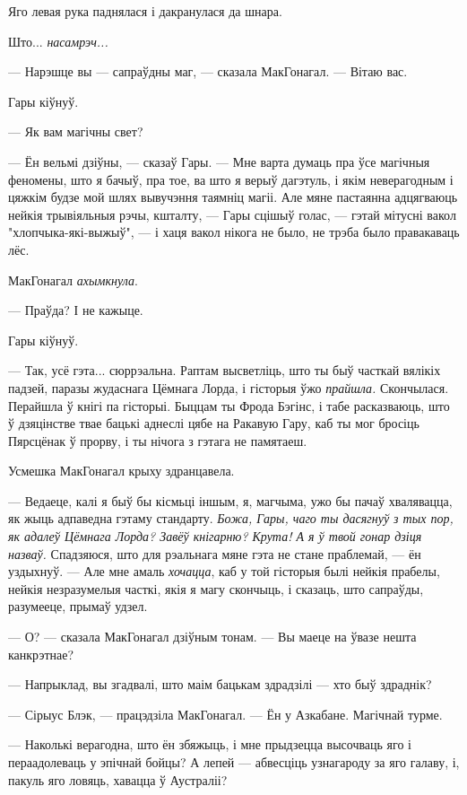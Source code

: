 Яго левая рука паднялася і дакранулася да шнара.

Што... \emph{насамрэч...}

--- Нарэшце вы --- сапраўдны маг, --- сказала МакГонагал. --- Вітаю вас.

Гары кіўнуў.

--- Як вам магічны свет?

--- Ён вельмі дзіўны, --- сказаў Гары. --- Мне варта думаць пра ўсе магічныя 
феномены, што я бачыў, пра тое, ва што я верыў дагэтуль, і якім неверагодным
і цяжкім будзе мой шлях вывучэння таямніц магіі. Але мяне пастаянна адцягваюць
нейкія трывіяльныя рэчы, кшталту, --- Гары сцішыў голас, --- гэтай
мітусні вакол "хлопчыка-які-выжыў", --- і хаця вакол нікога не было, не трэба
было правакаваць лёс.

МакГонагал \emph{ахымкнула}.

--- Праўда? І не кажыце.

Гары кіўнуў.

--- Так, усё гэта... сюррэальна. Раптам высветліць, што ты быў часткай вялікіх
падзей, паразы жудаснага Цёмнага Лорда, і гісторыя ўжо \emph{прайшла.} Скончылася.
Перайшла ў кнігі па гісторыі. Быццам ты Фрода Бэгінс, і табе расказваюць, што 
ў дзяцінстве твае бацькі аднеслі цябе на Ракавую Гару, каб ты мог
бросіць Пярсцёнак ў прорву, і ты нічога з гэтага не памятаеш.

Усмешка МакГонагал крыху здранцавела.

--- Ведаеце, калі я быў бы кісмьці іншым, я, магчыма, ужо бы пачаў хвалявацца,
як жыць адпаведна гэтаму стандарту.  \emph{Божа, Гары, чаго ты дасягнуў 
з тых пор, як адалеў Цёмнага Лорда? Завёў кнігарню? Крута! А я ў твой 
гонар дзіця назваў.} 
Спадзяюся, што для рэальнага мяне гэта не стане праблемай, --- ён 
уздыхнуў. --- Але мне амаль \emph{хочацца}, каб у той гісторыя былі нейкія прабелы, 
нейкія незразумелыя часткі, якія я магу скончыць, і сказаць, што сапраўды,
разумееце, прымаў удзел.

--- О? --- сказала МакГонагал дзіўным тонам. --- Вы маеце на ўвазе нешта
канкрэтнае?

--- Напрыклад, вы згадвалі, што маім бацькам здрадзілі --- хто быў здраднік?

--- Сірыус Блэк, --- працэдзіла МакГонагал. --- Ён у Азкабане. Магічнай турме.

--- Наколькі верагодна, што ён збяжыць, і мне прыдзецца высочваць яго і пераадолеваць
у эпічнай бойцы? А лепей --- абвесціць узнагароду за яго галаву, і, пакуль
яго ловяць, хавацца ў Аустраліі?

